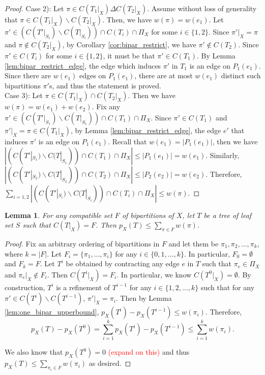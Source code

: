 \documentclass{bmcart}
\newcommand{\note}[1]{\textcolor{red}{#1}}
\newtheorem{lemma}{Lemma}
\begin{document}
\begin{proof}
    Case 2): Let $\pi \in C(T_1|_X) \Delta C(T_2|_X)$. Assume without loss of generality that $\pi \in C(T_1|_X) \backslash C(T_2|_X)$. Then, we have $w(\pi) = w(e_1)$. Let $\pi'\in (C(T'|_{S_i})\backslash C(T|_{S_i})) \cap C(T_i) \cap \Pi_X$ for some $i \in \{1,2\}$. Since $\pi'|_X = \pi$ and $\pi \notin C(T_2|_X)$, by Corollary \ref{cor:bipar_restrict}, we have $\pi' \notin C(T_2)$. Since $\pi' \in C(T_i)$ for some $i\in \{1,2\}$, it must be that $\pi' \in C(T_1)$. By Lemma \ref{lem:bipar_restrict_edge}, the edge which induces $\pi'$ in $T_1$ is an edge on $P_1(e_1)$. Since there are $w(e_1)$ edges on $P_1(e_1)$, there are at most $w(e_1)$ distinct such bipartitions $\pi'$s, and thus the statement is proved.\\
    
    Case 3): Let $\pi \in C(T_1|_X) \cap C(T_2|_X)$. Then we have $w(\pi) = w(e_1)+w(e_2)$. Fix any $\pi'\in (C(T'|_{S_1})\backslash C(T|_{S_1})) \cap C(T_1) \cap \Pi_X$. Since $\pi' \in C(T_1)$ and $\pi'|_X = \pi \in C(T_1|_X)$, by Lemma \ref{lem:bipar_restrict_edge}, the edge $e'$ that induces $\pi'$ is an edge on $P_1(e_1)$. Recall that $w(e_1) = |P_1(e_1)|$, then we have $|(C(T'|_{S_1})\backslash C(T|_{S_1})) \cap C(T_1) \cap \Pi_X| \le |P_1(e_1)| = w(e_1)$. Similarly, $|(C(T'|_{S_2})\backslash C(T|_{S_2})) \cap C(T_2) \cap \Pi_X| \le |P_2(e_2)| = w(e_2)$. Therefore, $\sum_{i = 1,2}|(C(T'|_{S_i})\backslash C(T|_{S_i})) \cap C(T_i) \cap \Pi_X| \le w(\pi)$.
\end{proof}


\begin{lemma} \label{lem:compatible_set_upperbound}
    For any compatible set $F$ of bipartitions of $X$, let $T$ be a tree of leaf set $S$ such that $C(T|_X) = F$. Then $p_X(T) \le \sum_{\pi \in F} w(\pi)$.
\end{lemma}
\begin{proof}
    
    Fix an arbitrary ordering of bipartitions in $F$ and let them be $\pi_1,\pi_2,\dots,\pi_k$, where $k = |F|$. Let $F_i = \{\pi_1,\dots, \pi_i\}$ for any $i \in \{0,1,\dots,k\}$. In particular, $F_0 = \emptyset$ and $F_k = F$. Let $T^i$ be obtained by contracting any edge $e$ in $T$ such that $\pi_e \in \Pi_X$ and $\pi_e|_X \notin F_i$. Then $C(T^i|_X) = F_i$. In particular, we know $C(T^0|_X) = \emptyset$. By construction, $T^i$ is a refinement of $T^{i-1}$ for any $i \in \{1,2,\dots,k\}$ such that for any $\pi' \in C(T^i)\backslash C(T^{i-1})$, $\pi'|_X = \pi_i$. Then by Lemma \ref{lem:one_bipar_upperbound}, $p_X(T^i) - p_X(T^{i-1}) \le w(\pi_i)$. Therefore, 
    \[p_X(T) - p_X(T^0) = \sum_{i = 1}^k p_X(T^i) - p_X(T^{i-1}) \le \sum_{i = 1}^k w(\pi_i).\]
    
    We also know that $p_X(T^0) = 0$ \note{(expand on this)} and thus $p_X(T) \le \sum_{\pi_i \in F}w(\pi_i)$ as desired.
\end{proof}
\end{document}
